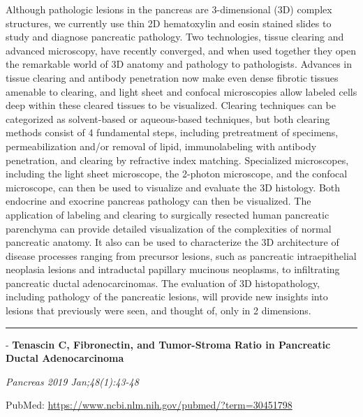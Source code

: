 \documentclass[]{article}
\begin{document}
Although pathologic lesions in the pancreas are 3-dimensional (3D)
complex structures, we currently use thin 2D hematoxylin and eosin
stained slides to study and diagnose pancreatic pathology. Two
technologies, tissue clearing and advanced microscopy, have recently
converged, and when used together they open the remarkable world of 3D
anatomy and pathology to pathologists. Advances in tissue clearing and
antibody penetration now make even dense fibrotic tissues amenable to
clearing, and light sheet and confocal microscopies allow labeled cells
deep within these cleared tissues to be visualized. Clearing techniques
can be categorized as solvent-based or aqueous-based techniques, but
both clearing methods consist of 4 fundamental steps, including
pretreatment of specimens, permeabilization and/or removal of lipid,
immunolabeling with antibody penetration, and clearing by refractive
index matching. Specialized microscopes, including the light sheet
microscope, the 2-photon microscope, and the confocal microscope, can
then be used to visualize and evaluate the 3D histology. Both endocrine
and exocrine pancreas pathology can then be visualized. The application
of labeling and clearing to surgically resected human pancreatic
parenchyma can provide detailed visualization of the complexities of
normal pancreatic anatomy. It also can be used to characterize the 3D
architecture of disease processes ranging from precursor lesions, such
as pancreatic intraepithelial neoplasia lesions and intraductal
papillary mucinous neoplasms, to infiltrating pancreatic ductal
adenocarcinomas. The evaluation of 3D histopathology, including
pathology of the pancreatic lesions, will provide new insights into
lesions that previously were seen, and thought of, only in 2 dimensions.

{}

{}

\begin{center}\rule{0.5\linewidth}{\linethickness}\end{center}

 - \textbf{Tenascin C, Fibronectin, and Tumor-Stroma Ratio in Pancreatic
Ductal Adenocarcinoma}

\emph{Pancreas 2019 Jan;48(1):43-48}

PubMed: \url{https://www.ncbi.nlm.nih.gov/pubmed/?term=30451798}
\end{document}
